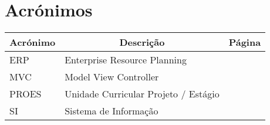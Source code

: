 

\chapter[Acrónimos]{Acrónimos}

\begin{center}
\small
\begin{longtable}{lp{3.0in}c}
\toprule \multicolumn{1}{c}{Acrónimo} 
                & \multicolumn{1}{c}{Descrição}
                                & \multicolumn{1}{c}{Página}\\ \midrule\addlinespace[2pt] \endhead

\bottomrule\endfoot

ERP		& Enterprise Resource Planning			& \pageref{sym:ERP}\\
MVC		& Model View Controller					& \pageref{sym:MVC}\\
PROES	& Unidade Curricular Projeto / Estágio	& \pageref{sym:PROES}\\
SI		& Sistema de Informação					& \pageref{sym:SI}\\


\end{longtable}

\end{center}

